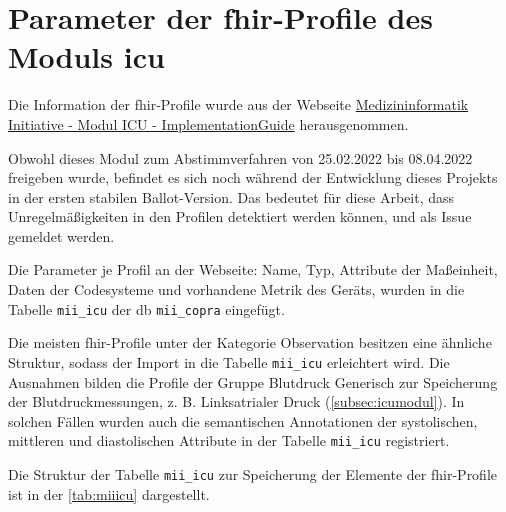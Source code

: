 \section{Parameter der \acs{fhir}-Profile des Moduls \glqq\acs{icu}\grqq{}} \label{sec:fhirprofs}

Die Information der \ac{fhir}-Profile wurde aus der Webseite \href{https://www.medizininformatik-initiative.de/Kerndatensatz/Modul_Intensivmedizin/IGMIIKDSModulICU.html}{Medizininformatik Initiative - Modul ICU - ImplementationGuide} herausgenommen. 

Obwohl dieses Modul zum Abstimmverfahren von 25.02.2022 bis 08.04.2022 freigeben wurde, befindet es sich noch während der Entwicklung dieses Projekts in der ersten stabilen Ballot-Version. Das bedeutet für diese Arbeit, dass Unregelmäßigkeiten in den Profilen detektiert werden können, und als Issue gemeldet werden.

Die Parameter je Profil an der Webseite: Name, Typ, Attribute der Maßeinheit, Daten der Codesysteme und vorhandene Metrik des Geräts, wurden in die Tabelle \texttt{mii\_icu} der \ac{db} \texttt{mii\_copra} eingefügt.

Die meisten \ac{fhir}-Profile unter der Kategorie \glqq Observation\grqq{} besitzen eine ähnliche Struktur, sodass der Import in die Tabelle \texttt{mii\_icu} erleichtert wird. Die Ausnahmen bilden die Profile der Gruppe \glqq Blutdruck Generisch\grqq{} zur Speicherung der Blutdruckmessungen, z. B. \glqq Linksatrialer Druck\grqq{} (\ref{subsec:icumodul}). In solchen Fällen wurden auch die semantischen Annotationen der systolischen, mittleren und diastolischen Attribute in der Tabelle \texttt{mii\_icu} registriert.

\newpage

Die Struktur der Tabelle \texttt{mii\_icu} zur Speicherung der Elemente der \ac{fhir}-Profile ist in der \ref{tab:miiicu} dargestellt.

